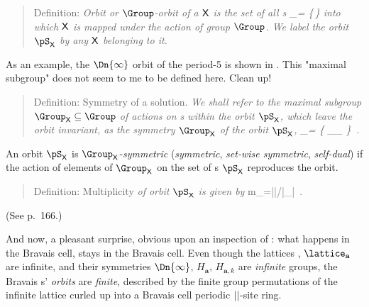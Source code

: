     \begin{quote}
Definition: {\em
{\em Orbit} or \emph{$\Group$-orbit} of a {\lattstate} $\mathsf{X}$ is the
set of all {\lattstate}s
\beq
    \pS_\Xx = \{\LieEl\,\Xx \mid \LieEl \in {\Group}\}
into which $\mathsf{X}$ is mapped under the action of group $\Group$.
We label the orbit $\pS_\Xx$ by any {\lattstate} $\mathsf{X}$ belonging to
it.
            }
    \end{quote}
As an example, the $\Dn{\infty}$ orbit of the period-5 {\lattstate}
is shown in .
     {
    This "maximal subgroup" does not seem to me to be defined here.
    Clean up!
    }
    \begin{quote}
Definition: Symmetry of a solution.
{\em
We shall refer to the maximal subgroup $\Group_\Xx \subseteq  \Group$ of
actions on {\lattstate}s within the orbit $\pS_\Xx$, which leave
the orbit invariant, as the \emph{symmetry}
$\Group_\Xx$ of the orbit $\pS_\Xx$,
\beq
\Group_\Xx =
   \{ \LieEl \in \Group_\Xx \mid \LieEl \Xx \in \pS_\Xx
   \}
\,.
}
    \end{quote}
An orbit $\pS_\Xx$ is $\Group_\Xx$-{\em symmetric}
({\em symmetric}, {\em set-wise symmetric}, {\em self-dual})
if the action of elements of $\Group_\Xx$ on
the set of {\lattstate}s $\pS_\Xx$ reproduces the orbit.
%
    \begin{quote}
Definition: Multiplicity
{\em
of orbit $\pS_\Xx$ is given by
}
\beq
m_\Xx=|\Group|/|\Group_{\Xx}|
\,.
    \end{quote}
(See  {p.~166}.)



\bigskip

And now, a pleasant surprise, obvious upon an inspection of
: what happens
in the Bravais cell, stays in the Bravais cell.
Even though
the lattices \lattice, $\lattice_{\mathbf{a}}$ are infinite,
and their symmetries
$\Dn{\infty}$, $H_{\mathbf{a}}$, $H_{\mathbf{a},k}$ are
\emph{infinite} groups, the Bravais {\lattstate}s'
\emph{orbits} are \emph{finite}, described by the finite group
permutations of the infinite lattice curled up into a Bravais cell periodic
${||}$-site ring.


